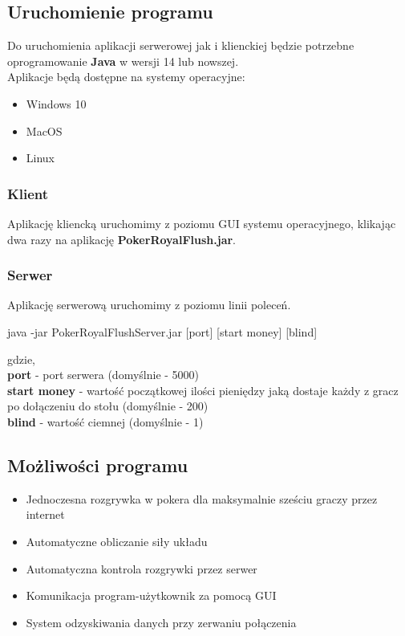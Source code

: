 \documentclass{article}
\begin{document}
    \subsection{Uruchomienie programu}
        Do uruchomienia aplikacji serwerowej jak i klienckiej będzie potrzebne oprogramowanie \textbf{Java} w wersji 14 lub nowszej.\\
        Aplikacje będą dostępne na systemy operacyjne:
        \begin{itemize}
            \item Windows 10
            \item MacOS
            \item Linux
        \end{itemize}
        \subsubsection{Klient}
            Aplikację kliencką uruchomimy z poziomu GUI systemu operacyjnego, klikając dwa razy na aplikację \textbf{PokerRoyalFlush.jar}.
            
        \subsubsection{Serwer}
            Aplikację serwerową uruchomimy z poziomu linii poleceń.
            \begin{center}
                java -jar PokerRoyalFlushServer.jar [port] [start money] [blind]
            \end{center}
            gdzie,\\
            \textbf{port} - port serwera (domyślnie - 5000)\\
            \textbf{start money} - wartość początkowej ilości pieniędzy jaką dostaje każdy z gracz po dołączeniu do stołu (domyślnie - 200)\\
            \textbf{blind} - wartość ciemnej (domyślnie - 1)
    
    \subsection{Możliwości programu}
        \begin{itemize}
            \item Jednoczesna rozgrywka w pokera dla maksymalnie sześciu graczy przez internet
            \item Automatyczne obliczanie siły układu
            \item Automatyczna kontrola rozgrywki przez serwer
            \item Komunikacja program-użytkownik za pomocą GUI
            \item System odzyskiwania danych przy zerwaniu połączenia
        \end{itemize}
\end{document}
